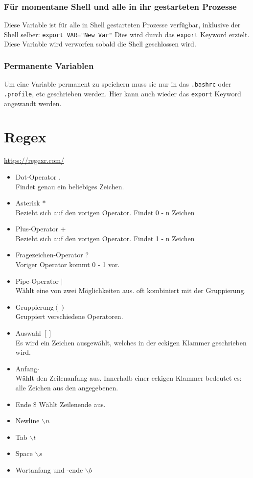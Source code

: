 \documentclass{article}
\newcommand{\cmdinline}[1]{\texttt{#1}}
\newcommand{\bashinline}[1]{\texttt{#1}}
\begin{document}
\subsubsection{Für momentane Shell und alle in ihr gestarteten Prozesse}
Diese Variable ist für alle in Shell gestarteten Prozesse verfügbar, inklusive der Shell selber:
\bashinline{export VAR="New Var"}
Dies wird durch das \cmdinline{export} Keyword erzielt.
Diese Variable wird verworfen sobald die Shell geschlossen wird.

\subsubsection{Permanente Variablen}
Um eine Variable permanent zu speichern muss sie nur in das \cmdinline{.bashrc} oder \cmdinline{.profile}, etc geschrieben werden.
Hier kann auch wieder das \cmdinline{export} Keyword angewandt werden.

\section{Regex}
\href{https://regexr.com/}{https://regexr.com/}
\begin{itemize}
\item Dot-Operator \(.\)\\
  Findet genau ein beliebiges Zeichen.
\item Asterisk \(*\)\\
  Bezieht sich auf den vorigen Operator.
  Findet 0 - n Zeichen
\item Plus-Operator \(+\)\\
  Bezieht sich auf den vorigen Operator.
  Findet 1 - n Zeichen
\item Fragezeichen-Operator \(?\)\\
  Voriger Operator kommt 0 - 1 vor.
\item Pipe-Operator \(|\)\\
  Wählt eine von zwei Möglichkeiten aus.
  oft kombiniert mit der Gruppierung.
\item Gruppierung\(()\)\\
  Gruppiert verschiedene Operatoren.
\item Auswahl \([]\)\\
  Es wird ein Zeichen ausgewählt, welches in der eckigen Klammer geschrieben wird.
\item Anfang \(\hat{}\)\\
  Wählt den Zeilenanfang aus.
  Innerhalb einer eckigen Klammer bedeutet es: alle Zeichen aus den angegebenen.
\item Ende \(\$\)
  Wählt Zeilenende aus.
\item Newline \(\backslash n\)
\item Tab \(\backslash t\)
\item Space \(\backslash s\)
\item Wortanfang und -ende \(\backslash b\)
  
\end{itemize}
\end{document}
